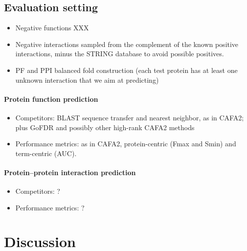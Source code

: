 \documentclass{bioinfo}
\begin{document}
\subsection{Evaluation setting}

\begin{itemize}

    \item Negative functions XXX

    \item Negative interactions sampled from the complement of the known
    positive interactions, minus the STRING database to avoid possible
    positives.

    \item PF and PPI balanced fold construction (each test protein has
    at least one unknown interaction that we aim at predicting)

\end{itemize}

\paragraph{Protein function prediction}

\begin{itemize}

    \item Competitors: BLAST sequence transfer and nearest neighbor, as in
    CAFA2; plus GoFDR and possibly other high-rank CAFA2 methods

    \item Performance metrics: as in CAFA2, protein-centric (Fmax and Smin)
    and term-centric (AUC).

\end{itemize}

\paragraph{Protein--protein interaction prediction}

\begin{itemize}

    \item Competitors: ?

    \item Performance metrics: ?

\end{itemize}



\section{Discussion}
\end{document}

